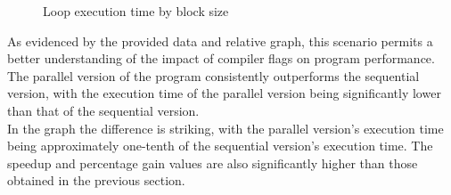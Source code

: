 \documentclass{article}
\begin{document}
\begin{figure}[h!tb]
    \centering
    \captionsetup{
        type=plot,
        belowskip=10pt,
    }
    \caption{Loop execution time by block size}
\end{figure}

As evidenced by the provided data and relative graph, this scenario permits a better understanding of the impact of compiler flags on program performance.\\
The parallel version of the program consistently outperforms the sequential version, with the execution time of the parallel version being significantly lower than that of the sequential version.\\
In the graph the difference is striking, with the parallel version's execution time being approximately one-tenth of the sequential version's execution time. %
The speedup and percentage gain values are also significantly higher than those obtained in the previous section.
\end{document}
